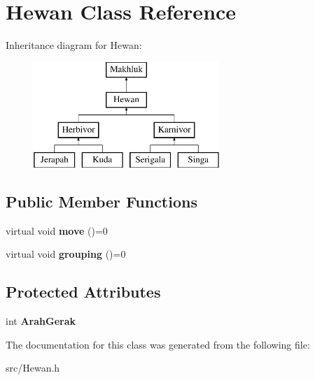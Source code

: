 \hypertarget{class_hewan}{}\section{Hewan Class Reference}
\label{class_hewan}
Inheritance diagram for Hewan\+:\begin{figure}[H]
\begin{center}
\leavevmode
\includegraphics[height=4.000000cm]{class_hewan}
\end{center}
\end{figure}
\subsection*{Public Member Functions}
\begin{DoxyCompactItemize}
\item 
\hypertarget{class_hewan_a8fc5ef4205a20f72339e5576d5bafad5}{}virtual void {\bfseries move} ()=0\label{class_hewan_a8fc5ef4205a20f72339e5576d5bafad5}

\item 
\hypertarget{class_hewan_ab091ad8e469a41a3ad975c93d19c5387}{}virtual void {\bfseries grouping} ()=0\label{class_hewan_ab091ad8e469a41a3ad975c93d19c5387}

\end{DoxyCompactItemize}
\subsection*{Protected Attributes}
\begin{DoxyCompactItemize}
\item 
\hypertarget{class_hewan_ab5383da8d9339d4dfe14a1df5816f8f3}{}int {\bfseries Arah\+Gerak}\label{class_hewan_ab5383da8d9339d4dfe14a1df5816f8f3}

\end{DoxyCompactItemize}


The documentation for this class was generated from the following file\+:\begin{DoxyCompactItemize}
\item 
src/Hewan.\+h\end{DoxyCompactItemize}
